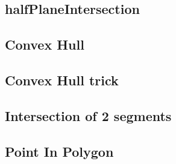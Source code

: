 \documentclass[a4paper,10pt,twocolumn,oneside]{article}
\begin{document}
% 
\subsection{halfPlaneIntersection}


\subsection{Convex Hull}


\subsection{Convex Hull trick}


%

\subsection{Intersection of 2 segments}


%

%

\subsection{Point In Polygon}


%
\end{document}
